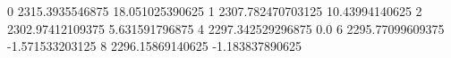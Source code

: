 0 2315.3935546875 18.051025390625
1 2307.782470703125 10.43994140625
2 2302.97412109375 5.631591796875
4 2297.342529296875 0.0
6 2295.77099609375 -1.571533203125
8 2296.15869140625 -1.183837890625
